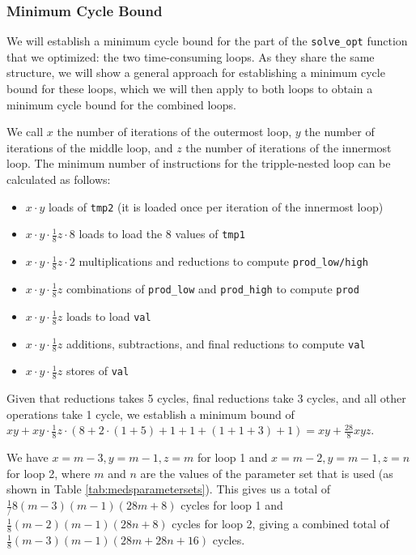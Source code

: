 \documentclass[11pt,a4paper]{report}
\theoremstyle{definition}
\begin{document}
\subsubsection{Minimum Cycle Bound}
We will establish a minimum cycle bound for the part of the \texttt{solve\_opt} function that we optimized: the two time-consuming loops. As they share the same structure, we will show a general approach for establishing a minimum cycle bound for these loops, which we will then apply to both loops to obtain a minimum cycle bound for the combined loops.

We call $x$ the number of iterations of the outermost loop, $y$ the number of iterations of the middle loop, and $z$ the number of iterations of the innermost loop. The minimum number of instructions for the tripple-nested loop can be calculated as follows:
\begin{itemize}
  \item $x \cdot y$ loads of \texttt{tmp2} (it is loaded once per iteration of the innermost loop)
  \item $x \cdot y \cdot \frac{1}{8}z \cdot 8$ loads to load the 8 values of \texttt{tmp1}
  \item $x \cdot y \cdot \frac{1}{8}z \cdot 2$ multiplications and reductions to compute \texttt{prod\_low/high}
  \item $x \cdot y \cdot \frac{1}{8}z$ combinations of \texttt{prod\_low} and \texttt{prod\_high} to compute \texttt{prod}
  \item $x \cdot y \cdot \frac{1}{8}z$ loads to load \texttt{val}
  \item $x \cdot y \cdot \frac{1}{8}z$ additions, subtractions, and final reductions to compute \texttt{val}
  \item $x \cdot y \cdot \frac{1}{8}z$ stores of \texttt{val}
\end{itemize}
Given that reductions takes 5 cycles, final reductions take 3 cycles, and all other operations take 1 cycle, we establish a minimum bound of $xy + xy \cdot \frac{1}{8}z \cdot (8 + 2 \cdot (1 + 5) + 1 + 1 + (1 + 1 + 3) + 1) = xy + \frac{28}{8}xyz$.

We have $x = m - 3, y = m - 1, z = m$ for loop 1 and $x = m - 2, y = m - 1, z = n$ for loop 2, where $m$ and $n$ are the values of the parameter set that is used (as shown in Table \ref{tab:medsparametersets}). This gives us a total of $\frac{1}/{8}(m-3)(m-1)(28m + 8)$ cycles for loop 1 and $\frac{1}{8}(m-2)(m-1)(28n + 8)$ cycles for loop 2, giving a combined total of $\frac{1}{8}(m-3)(m-1)(28m + 28n + 16)$ cycles.
\end{document}
